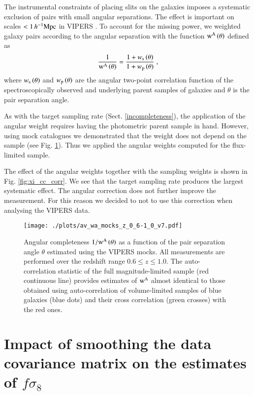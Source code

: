 \documentclass[longauth]{aa}
\def\({\left(}
\def\){\right)}
\def\mhmpc{\,h^{-1}{\rm Mpc}}
\begin{document}
The instrumental constraints of placing slits on the galaxies imposes a systematic exclusion of pairs with small angular separations.  The effect is important on scales $<1\mhmpc$ in VIPERS \citep{delatorre13a}. To account for the missing power, we weighted galaxy pairs according to the angular separation with the function $\rm{w^{A}}\(\theta\)$ \citep{hawkins03} defined as
    \begin{equation}
        \frac{1}{\rm{w^{A}}\(\theta\)}=\frac{1+w_{\rm{s}}\(\theta\)}{1+w_{\rm{p}}\(\theta\)}\; ,       \label{eq:ang-weights}
    \end{equation}
where $w_{\rm{s}}\(\theta\)$ and $w_{\rm{p}}\(\theta\)$ are the angular two-point correlation function of the spectroscopically observed and underlying parent samples of galaxies and $\theta$ is the pair separation angle.

As with the target sampling rate (Sect. \ref{incompleteness}), the application of the angular weight requires having the photometric parent sample in hand.  However, using mock catalogues we demonstrated that the weight does not depend on the sample (see Fig. \ref{fig:ang_corr}).  Thus we applied the angular weights computed for the flux-limited sample.

The effect of the angular weights together with the sampling weights is shown in Fig. \ref{fig:xi_cc_corr}.  We see that the target sampling rate produces the largest systematic effect.  The angular correction does not further improve the measurement. For this reason we decided to not to use this correction when analysing the VIPERS data.
    \begin{figure}
        \centering
        \texttt{[image: ./plots/av\_wa\_mocks\_z\_0\_6-1\_0\_v7.pdf]}
        \caption{Angular completeness $1/\rm{w^A}\(\theta\)$ as a function of the pair separation angle $\theta$ estimated using the VIPERS mocks. All measurements are performed over the  redshift range $0.6\le z\le1.0$. The auto-correlation statistic of the full magnitude-limited sample (red continuous line) provides estimates of $\rm{w^A}$ almost identical to those obtained using auto-correlation of volume-limited samples of blue galaxies (blue dots) and their cross correlation (green crosses) with the red ones. 
        }\label{fig:ang_corr}
    \end{figure}

\section{Impact of smoothing the data covariance matrix on the estimates of $f\sigma_8$}\label{app:smoothing}
\end{document}
